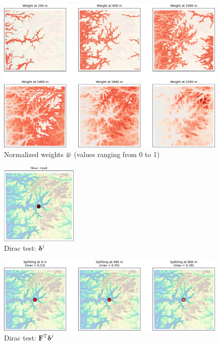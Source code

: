 \documentclass[12pt]{scrartcl}
\newcommand{\overbar}[1]{\mkern 1.5mu\overline{\mkern-1.5mu#1\mkern-1.5mu}\mkern 1.5mu}
\begin{document}
\begin{figure}[h!]
\centering
\includegraphics[width=\textwidth]{weights.jpg}
\caption{Normalized weights $\overbar{w}$ (values ranging from 0 to 1)} \label{fig:weights}
\end{figure}

\begin{figure}[h!]
\centering
\includegraphics[width=0.33\textwidth]{bottom_1-dirac_input.jpg}
\caption{Dirac test: $\boldsymbol{\delta}^j$} \label{fig:bottom_1-dirac_input}
\end{figure}

\begin{figure}[h!]
\centering
\includegraphics[width=\textwidth]{bottom_2-split.jpg}
\caption{Dirac test: $\mathbf{F}^\text{T} \boldsymbol{\delta}^j$} \label{fig:bottom_2-split}
\end{figure}
\end{document}
